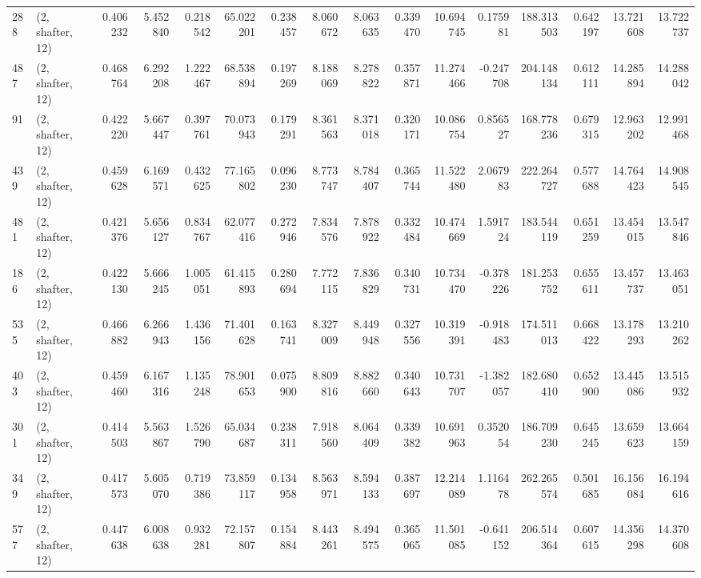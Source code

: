 \begin{tabular}{llrrrrrrrrrrrrrr}
288 &  (2, shafter, 12) &   0.406232 &   5.452840 &   0.218542 &    65.022201 &   0.238457 &   8.060672 &   8.063635 &  0.339470 &  10.694745 &   0.175981 &    188.313503 &   0.642197 &  13.721608 &   13.722737 \\
487 &  (2, shafter, 12) &   0.468764 &   6.292208 &   1.222467 &    68.538894 &   0.197269 &   8.188069 &   8.278822 &  0.357871 &  11.274466 &  -0.247708 &    204.148134 &   0.612111 &  14.285894 &   14.288042 \\
91  &  (2, shafter, 12) &   0.422220 &   5.667447 &   0.397761 &    70.073943 &   0.179291 &   8.361563 &   8.371018 &  0.320171 &  10.086754 &   0.856527 &    168.778236 &   0.679315 &  12.963202 &   12.991468 \\
439 &  (2, shafter, 12) &   0.459628 &   6.169571 &   0.432625 &    77.165802 &   0.096230 &   8.773747 &   8.784407 &  0.365744 &  11.522480 &   2.067983 &    222.264727 &   0.577688 &  14.764423 &   14.908545 \\
481 &  (2, shafter, 12) &   0.421376 &   5.656127 &   0.834767 &    62.077416 &   0.272946 &   7.834576 &   7.878922 &  0.332484 &  10.474669 &   1.591724 &    183.544119 &   0.651259 &  13.454015 &   13.547846 \\
186 &  (2, shafter, 12) &   0.422130 &   5.666245 &   1.005051 &    61.415893 &   0.280694 &   7.772115 &   7.836829 &  0.340731 &  10.734470 &  -0.378226 &    181.253752 &   0.655611 &  13.457737 &   13.463051 \\
535 &  (2, shafter, 12) &   0.466882 &   6.266943 &   1.436156 &    71.401628 &   0.163741 &   8.327009 &   8.449948 &  0.327556 &  10.319391 &  -0.918483 &    174.511013 &   0.668422 &  13.178293 &   13.210262 \\
403 &  (2, shafter, 12) &   0.459460 &   6.167316 &   1.135248 &    78.901653 &   0.075900 &   8.809816 &   8.882660 &  0.340643 &  10.731707 &  -1.382057 &    182.680410 &   0.652900 &  13.445086 &   13.515932 \\
301 &  (2, shafter, 12) &   0.414503 &   5.563867 &   1.526790 &    65.034687 &   0.238311 &   7.918560 &   8.064409 &  0.339382 &  10.691963 &   0.352054 &    186.709230 &   0.645245 &  13.659623 &   13.664159 \\
349 &  (2, shafter, 12) &   0.417573 &   5.605070 &   0.719386 &    73.859117 &   0.134958 &   8.563971 &   8.594133 &  0.387697 &  12.214089 &   1.116478 &    262.265574 &   0.501685 &  16.156084 &   16.194616 \\
577 &  (2, shafter, 12) &   0.447638 &   6.008638 &   0.932281 &    72.157807 &   0.154884 &   8.443261 &   8.494575 &  0.365065 &  11.501085 &  -0.641152 &    206.514364 &   0.607615 &  14.356298 &   14.370608 \\

\end{tabular}
